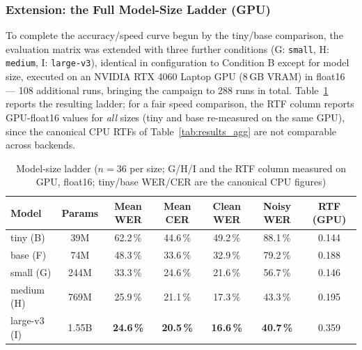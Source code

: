 \documentclass[12pt]{report}
\begin{document}
\subsubsection*{Extension: the Full Model-Size Ladder (GPU)}

To complete the accuracy/speed curve begun by the tiny/base comparison, the evaluation matrix was extended with three further conditions (G: \texttt{small}, H: \texttt{medium}, I: \texttt{large-v3}), identical in configuration to Condition B except for model size, executed on an NVIDIA RTX 4060 Laptop GPU (8\,GB VRAM) in float16 --- 108 additional runs, bringing the campaign to 288 runs in total. Table~\ref{tab:ladder} reports the resulting ladder; for a fair speed comparison, the RTF column reports GPU-float16 values for \emph{all} sizes (tiny and base re-measured on the same GPU), since the canonical CPU RTFs of Table~\ref{tab:results_agg} are not comparable across backends.

\begin{table}[H]
\centering
\small
\begin{tabular}{|l|c|c|c|c|c|c|}
\hline
\textbf{Model} & \textbf{Params} & \textbf{Mean WER} & \textbf{Mean CER} & \textbf{Clean WER} & \textbf{Noisy WER} & \textbf{RTF (GPU)} \\ \hline
tiny (B) & 39M & 62.2\,\% & 44.6\,\% & 49.2\,\% & 88.1\,\% & 0.144 \\ \hline
base (F) & 74M & 48.3\,\% & 33.6\,\% & 32.9\,\% & 79.2\,\% & 0.188 \\ \hline
small (G) & 244M & 33.3\,\% & 24.6\,\% & 21.6\,\% & 56.7\,\% & 0.146 \\ \hline
medium (H) & 769M & 25.9\,\% & 21.1\,\% & 17.3\,\% & 43.3\,\% & 0.195 \\ \hline
large-v3 (I) & 1.55B & \textbf{24.6\,\%} & \textbf{20.5\,\%} & \textbf{16.6\,\%} & \textbf{40.7\,\%} & 0.359 \\ \hline
\end{tabular}
\caption{Model-size ladder ($n=36$ per size; G/H/I and the RTF column measured on GPU, float16; tiny/base WER/CER are the canonical CPU figures)}
\label{tab:ladder}
\end{table}
\end{document}
